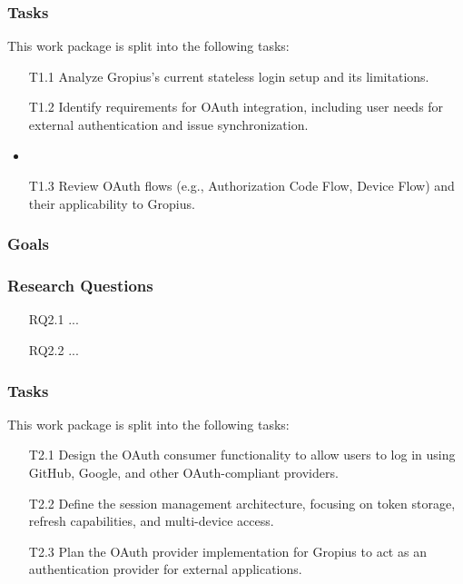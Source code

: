 \subsubsection{Tasks}
This work package is split into the following tasks:
\begin{itemize}
	\item[T1.1] Analyze Gropius's current stateless login setup and its limitations.
	\item[T1.2] Identify requirements for OAuth integration, including user needs for external authentication and issue synchronization.
	\item %
	\item[T1.3] Review OAuth flows (e.g., Authorization Code Flow, Device Flow) and their applicability to Gropius.
\end{itemize}



\subsubsection{Goals}


\subsubsection{Research Questions}
\begin{itemize}
	\item[RQ2.1] ...
	\item[RQ2.2] ...
\end{itemize}

\subsubsection{Tasks}
This work package is split into the following tasks:
\begin{itemize}
	\item[T2.1] Design the OAuth consumer functionality to allow users to log in using GitHub, Google, and other OAuth-compliant providers.
	\item[T2.2] Define the session management architecture, focusing on token storage, refresh capabilities, and multi-device access.
	\item[T2.3] Plan the OAuth provider implementation for Gropius to act as an authentication provider for external applications.
\end{itemize}

